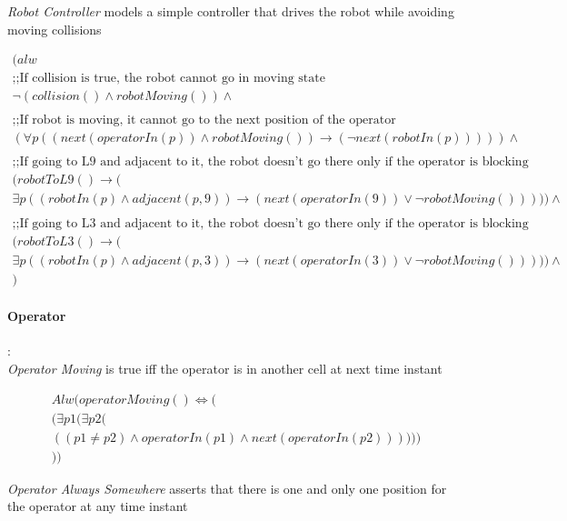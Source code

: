 \textit{Robot Controller} models a simple controller that drives the robot while avoiding moving collisions

\begin{align*}
	(alw\\
	\text{;;If collision is true, the robot cannot go in moving state}\\
	\neg(collision()\land robotMoving())\land \\
	\\
	\text{;;If robot is moving, it cannot go to the next position of the operator}\\
	(\forall p((next(operatorIn(p))\land robotMoving())\longrightarrow(\neg next(robotIn(p)))))\land\\
	\\
	\text{;;If going to L9 and adjacent to it, the robot doesn't go there only if the operator is blocking}\\
	(robotToL9()\longrightarrow(\\
	\exists p((robotIn(p)\land adjacent(p,9))\longrightarrow(next(operatorIn(9))\lor \neg robotMoving()))))\land\\
	\\
	\text{;;If going to L3 and adjacent to it, the robot doesn't go there only if the operator is blocking}\\
	(robotToL3()\longrightarrow(\\
	\exists p((robotIn(p)\land adjacent(p,3))\longrightarrow(next(operatorIn(3))\lor \neg robotMoving()))))\land\\
	)
\end{align*}


\paragraph{Operator}:\\

\textit{Operator Moving} is true iff the operator is in another cell at next time instant

\begin{align*}
	Alw(operatorMoving()\iff (\\
	(\exists p1(\exists p2 (\\
	((p1\neq p2)\land operatorIn(p1) \land next(operatorIn(p2))) )))\\
	))
\end{align*}

\textit{Operator Always Somewhere} asserts that there is one and only one position for the operator at any time instant

